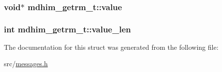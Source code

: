 \hypertarget{structmdhim__getrm__t_ae1e2ce047de1164dcdb1bcfe0f6fd0ae}{
\subsubsection[{value}]{\setlength{\rightskip}{0pt plus 5cm}void$\ast$ mdhim\-\_\-getrm\-\_\-t\-::value}}\label{d5/dfb/structmdhim__getrm__t_ae1e2ce047de1164dcdb1bcfe0f6fd0ae}
\hypertarget{structmdhim__getrm__t_af5959ca99312966ae31a7ffec962d9ea}{
\subsubsection[{value\-\_\-len}]{\setlength{\rightskip}{0pt plus 5cm}int mdhim\-\_\-getrm\-\_\-t\-::value\-\_\-len}}\label{d5/dfb/structmdhim__getrm__t_af5959ca99312966ae31a7ffec962d9ea}


The documentation for this struct was generated from the following file\-:\begin{DoxyCompactItemize}
\item 
src/\hyperlink{messages_8h}{messages.\-h}\end{DoxyCompactItemize}
